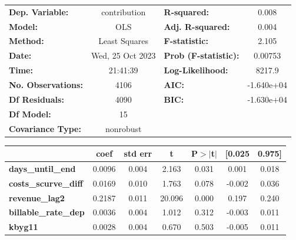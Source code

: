 \begin{center}
\begin{tabular}{lclc}
\toprule
\textbf{Dep. Variable:}                   &   contribution   & \textbf{  R-squared:         } &     0.008   \\
\textbf{Model:}                           &       OLS        & \textbf{  Adj. R-squared:    } &     0.004   \\
\textbf{Method:}                          &  Least Squares   & \textbf{  F-statistic:       } &     2.105   \\
\textbf{Date:}                            & Wed, 25 Oct 2023 & \textbf{  Prob (F-statistic):} &  0.00753    \\
\textbf{Time:}                            &     21:41:39     & \textbf{  Log-Likelihood:    } &    8217.9   \\
\textbf{No. Observations:}                &        4106      & \textbf{  AIC:               } & -1.640e+04  \\
\textbf{Df Residuals:}                    &        4090      & \textbf{  BIC:               } & -1.630e+04  \\
\textbf{Df Model:}                        &          15      & \textbf{                     } &             \\
\textbf{Covariance Type:}                 &    nonrobust     & \textbf{                     } &             \\
\bottomrule
\end{tabular}
\begin{tabular}{lcccccc}
                                          & \textbf{coef} & \textbf{std err} & \textbf{t} & \textbf{P$> |$t$|$} & \textbf{[0.025} & \textbf{0.975]}  \\
\midrule
\textbf{days\_until\_end}                 &       0.0096  &        0.004     &     2.163  &         0.031        &        0.001    &        0.018     \\
\textbf{costs\_scurve\_diff}              &       0.0169  &        0.010     &     1.763  &         0.078        &       -0.002    &        0.036     \\
\textbf{revenue\_lag2}                    &       0.2187  &        0.011     &    20.096  &         0.000        &        0.197    &        0.240     \\
\textbf{billable\_rate\_dep}              &       0.0036  &        0.004     &     1.012  &         0.312        &       -0.003    &        0.011     \\
\textbf{kbyg11}                           &       0.0028  &        0.004     &     0.670  &         0.503        &       -0.005    &        0.011     \\

\end{tabular}
\end{center}
